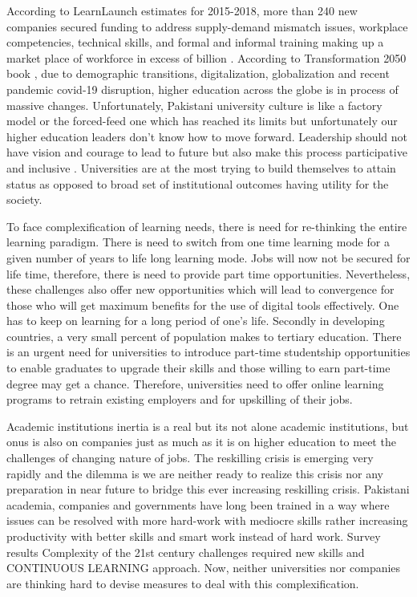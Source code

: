 \documentclass[
]{aft}
\begin{document}
According to LearnLaunch estimates for 2015-2018, more than 240 new
companies secured funding to address supply-demand mismatch issues,
workplace competencies, technical skills, and formal and informal
training making up a market place of workforce in excess of billion
\citet{Colin2018} . According to Transformation 2050 book
\citet{Sohail2018} , due to demographic transitions, digitalization,
globalization and recent pandemic covid-19 disruption, higher education
across the globe is in process of massive changes. Unfortunately,
Pakistani university culture is like a factory model or the forced-feed
one which has reached its limits but unfortunately our higher education
leaders don't know how to move forward. Leadership should not have
vision and courage to lead to future but also make this process
participative and inclusive . Universities are at the most trying to
build themselves to attain status as opposed to broad set of
institutional outcomes having utility for the society.

To face complexification of learning needs, there is need for
re-thinking the entire learning paradigm. There is need to switch from
one time learning mode for a given number of years to life long learning
mode. Jobs will now not be secured for life time, therefore, there is
need to provide part time opportunities. Nevertheless, these challenges
also offer new opportunities which will lead to convergence for those
who will get maximum benefits for the use of digital tools effectively.
One has to keep on learning for a long period of one's life. Secondly in
developing countries, a very small percent of population makes to
tertiary education. There is an urgent need for universities to
introduce part-time studentship opportunities to enable graduates to
upgrade their skills and those willing to earn part-time degree may get
a chance. Therefore, universities need to offer online learning programs
to retrain existing employers and for upskilling of their jobs.

Academic institutions inertia is a real but its not alone academic
institutions, but onus is also on companies just as much as it is on
higher education to meet the challenges of changing nature of jobs. The
reskilling crisis is emerging very rapidly and the dilemma is we are
neither ready to realize this crisis nor any preparation in near future
to bridge this ever increasing reskilling crisis. Pakistani academia,
companies and governments have long been trained in a way where issues
can be resolved with more hard-work with mediocre skills rather
increasing productivity with better skills and smart work instead of
hard work. Survey results Complexity of the 21st century challenges
required new skills and CONTINUOUS LEARNING approach. Now, neither
universities nor companies are thinking hard to devise measures to deal
with this complexification.
\end{document}
